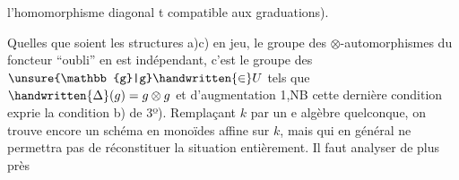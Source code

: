 l'homomorphisme diagonal t compatible aux graduations).

\handwritten{9\unsure{/|)}} Quelles que soient les structures a)c) en jeu, le groupe des $\otimes$-automorphismes du foncteur  ``oubli'' en est indépendant, c'est le groupe des $\unsure{\mathbb{g}|g}\handwritten{\in}U$ tels que $\handwritten{\Delta}(g)=g\otimes g$ et d'augmentation 1,\unsure{(}NB cette dernière condition exprie la condition b) de 3º). Remplaçant $k$ par un e algèbre quelconque, on trouve encore un  schéma en monoïdes affine sur $k$, mais qui en général ne permettra pas de réconstituer la situation entièrement.  Il faut analyser de plus près
